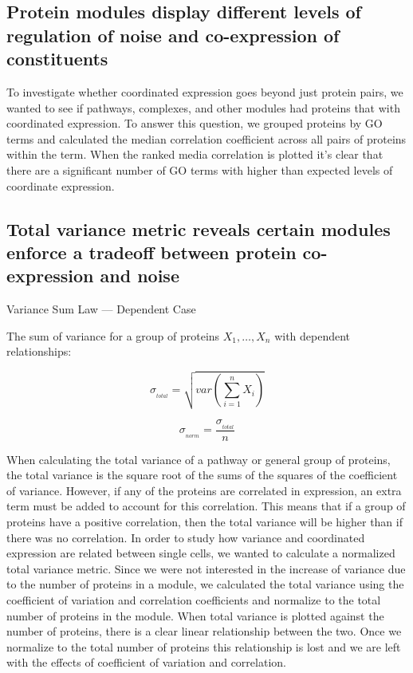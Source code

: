 \documentclass[11pt,]{article}
\begin{document}
\hypertarget{protein-modules-display-different-levels-of-regulation-of-noise-and-co-expression-of-constituents}{%
\subsection{Protein modules display different levels of regulation of
noise and co-expression of
constituents}\label{protein-modules-display-different-levels-of-regulation-of-noise-and-co-expression-of-constituents}}

To investigate whether coordinated expression goes beyond just protein
pairs, we wanted to see if pathways, complexes, and other modules had
proteins that with coordinated expression. To answer this question, we
grouped proteins by GO terms and calculated the median correlation
coefficient across all pairs of proteins within the term. When the
ranked media correlation is plotted it's clear that there are a
significant number of GO terms with higher than expected levels of
coordinate expression.

\hypertarget{total-variance-metric-reveals-certain-modules-enforce-a-tradeoff-between-protein-co-expression-and-noise}{%
\subsection{Total variance metric reveals certain modules enforce a
tradeoff between protein co-expression and
noise}\label{total-variance-metric-reveals-certain-modules-enforce-a-tradeoff-between-protein-co-expression-and-noise}}

Variance Sum Law --- Dependent Case

The sum of variance for a group of proteins \(X_{1},\dotsc,X_{n}\) with
dependent relationships:

\[\sigma_{{}_{total}} = \sqrt{var\left(\sum_{i=1}^n X_{i}\right)}\]

\[\sigma_{{}_{norm}} = \dfrac{\sigma_{{}_{total}}}{n}\]

When calculating the total variance of a pathway or general group of
proteins, the total variance is the square root of the sums of the
squares of the coefficient of variance. However, if any of the proteins
are correlated in expression, an extra term must be added to account for
this correlation. This means that if a group of proteins have a positive
correlation, then the total variance will be higher than if there was no
correlation. In order to study how variance and coordinated expression
are related between single cells, we wanted to calculate a normalized
total variance metric. Since we were not interested in the increase of
variance due to the number of proteins in a module, we calculated the
total variance using the coefficient of variation and correlation
coefficients and normalize to the total number of proteins in the
module. When total variance is plotted against the number of proteins,
there is a clear linear relationship between the two. Once we normalize
to the total number of proteins this relationship is lost and we are
left with the effects of coefficient of variation and correlation.
\end{document}
